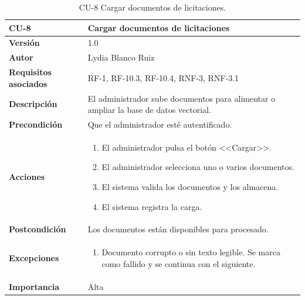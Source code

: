 \begin{table}[p]
	\centering
	\begin{tabularx}{\linewidth}{ p{} p{} }
		\toprule
		\textbf{CU-8}    & \textbf{Cargar documentos de licitaciones}\\
		\toprule
		\textbf{Versión}              & 1.0    \\
		\textbf{Autor}                & Lydia Blanco Ruiz \\
		\textbf{Requisitos asociados} & RF-1, RF-10.3, RF-10.4, RNF-3, RNF-3.1 \\
		\textbf{Descripción}          & El administrador sube documentos para alimentar o ampliar la base de datos vectorial. \\
		\textbf{Precondición}         & Que el administrador esté autentificado. \\
		\textbf{Acciones}             &
		\begin{enumerate}
			\def\labelenumi{\arabic{enumi}.}
			\tightlist
			\item El administrador pulsa el botón <<Cargar>>.
			\item El administrador selecciona uno o varios documentos.
			\item El sistema valida los documentos y los almacena.
			\item El sistema registra la carga.
		\end{enumerate}\\
		\textbf{Postcondición}        & Los documentos están disponibles para procesado. \\
		\textbf{Excepciones}          & 
		\begin{enumerate}
			\def\labelenumi{\arabic{enumi}.}
			\tightlist
			\item Documento corrupto o sin texto legible. Se marca como fallido y se continua con el siguiente.
		\end{enumerate}\\
		\textbf{Importancia}          & Alta  \\
		\bottomrule
	\end{tabularx}
	\caption{CU-8 Cargar documentos de licitaciones.}
\end{table}

